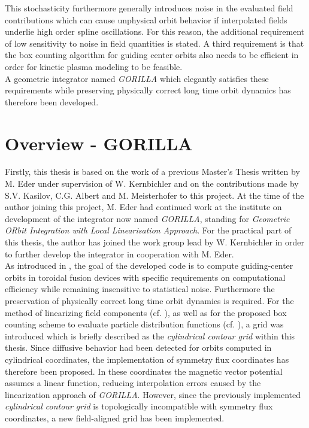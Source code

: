 \documentclass[main.tex]{subfiles}
\begin{document}
This stochasticity furthermore generally introduces noise in the evaluated field contributions which can cause unphysical orbit behavior if interpolated fields underlie high order spline oscillations. For this reason, the additional requirement of low sensitivity to noise in field quantities is stated. A third requirement is that the box counting algorithm for guiding center orbits also needs to be efficient in order for kinetic plasma modeling to be feasible.\\
A geometric integrator named \textit{GORILLA} which elegantly satisfies these requirements while preserving physically correct long time orbit dynamics has therefore been developed. 

\section{Overview - GORILLA}
Firstly, this thesis is based on the work of a previous Master's Thesis written by M. Eder \cite{Eder_DA} under supervision of W. Kernbichler and on the contributions made by S.V. Kasilov, C.G. Albert and M. Meisterhofer to this project. At the time of the author joining this project, M. Eder had continued work at the institute on development of the integrator now named \textit{GORILLA}, standing for \textit{Geometric ORbit Integration with Local Linearisation Approach}. For the practical part of this thesis, the author has joined the work group lead by W. Kernbichler in order to further develop the integrator in cooperation with M. Eder.\\
As introduced in \cite{Eder_DA}, the goal of the developed code is to compute guiding-center orbits in toroidal fusion devices with specific requirements on computational efficiency while remaining insensitive to statistical noise. Furthermore the preservation of physically correct long time orbit dynamics is required. For the method of linearizing field components (cf. \cite{Eder_DA}), as well as for the proposed box counting scheme to evaluate particle distribution functions (cf. \cite{Eder_DA}), a grid was introduced which is briefly described as the \textit{cylindrical contour grid} within this thesis.
Since diffusive behavior had been detected for orbits computed in cylindrical coordinates, the implementation of symmetry flux coordinates has therefore been proposed. In these coordinates the magnetic vector potential assumes a linear function, reducing interpolation errors caused by the linearization approach of \textit{GORILLA}. However, since the previously implemented \textit{cylindrical contour grid} is topologically incompatible with symmetry flux coordinates, a new field-aligned grid has been implemented.
\end{document}
